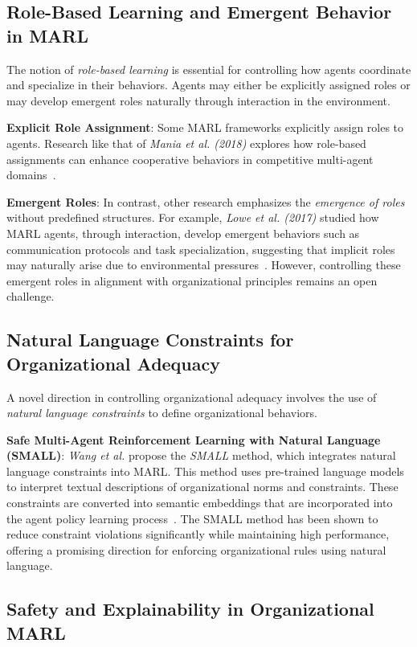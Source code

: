 \documentclass[sigconf,anonymous]{aamas}
\begin{document}
\subsection{Role-Based Learning and Emergent Behavior in MARL}

The notion of \textit{role-based learning} is essential for controlling how agents coordinate and specialize in their behaviors. Agents may either be explicitly assigned roles or may develop emergent roles naturally through interaction in the environment.

\textbf{Explicit Role Assignment}: Some MARL frameworks explicitly assign roles to agents. Research like that of \textit{Mania et al. (2018)} explores how role-based assignments can enhance cooperative behaviors in competitive multi-agent domains~\cite{mania2018team}.

\textbf{Emergent Roles}: In contrast, other research emphasizes the \textit{emergence of roles} without predefined structures. For example, \textit{Lowe et al. (2017)} studied how MARL agents, through interaction, develop emergent behaviors such as communication protocols and task specialization, suggesting that implicit roles may naturally arise due to environmental pressures~\cite{lowe2017multi}. However, controlling these emergent roles in alignment with organizational principles remains an open challenge.

\subsection{Natural Language Constraints for Organizational Adequacy}

A novel direction in controlling organizational adequacy involves the use of \textit{natural language constraints} to define organizational behaviors.

\textbf{Safe Multi-Agent Reinforcement Learning with Natural Language (SMALL)}: \textit{Wang et al.} propose the \textit{SMALL} method, which integrates natural language constraints into MARL. This method uses pre-trained language models to interpret textual descriptions of organizational norms and constraints. These constraints are converted into semantic embeddings that are incorporated into the agent policy learning process~\cite{wang2024small}. The SMALL method has been shown to reduce constraint violations significantly while maintaining high performance, offering a promising direction for enforcing organizational rules using natural language.

\subsection{Safety and Explainability in Organizational MARL}
\end{document}
